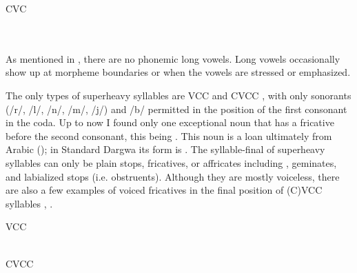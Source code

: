 \begin{exe}
\TabPositions{11em}
	\ex	CVC	\label{ex:syllable CVC phon} \\
		 	\tab 	{} 	\\
		 	\tab 	{} 	\\
		 	\tab 	{} 	
\end{exe}

As mentioned in , there are no phonemic long vowels. Long vowels occasionally show up at morpheme boundaries or when the vowels are stressed or emphasized.

The only types of superheavy syllables are VCC  and CVCC , with only sonorants (/r/, /l/, /n/, /m/, /j/) and /b/ permitted in the position of the first consonant in the coda. Up to now I found only one exceptional noun that has a fricative before the second consonant, this being  . This noun is a loan ultimately from Arabic (); in Standard Dargwa its form is . The syllable-final  of superheavy syllables can only be plain stops, fricatives, or affricates including , geminates, and labialized stops (i.e. obstruents). Although they are mostly voiceless, there are also a few examples of voiced fricatives in the final position of (C)VCC syllables , .
%
\begin{exe}
\TabPositions{13em}
	\ex	VCC	\label{ex:syllable VCC phon}\\
		 	\tab 		{} 	\\
		 	\tab 		{} 	
\end{exe}

\begin{exe}
\TabPositions{13em}
	\ex	CVCC	\label{ex:syllable CVCC phon}\\
		 	\tab 		{} 	\\
		  	\tab 		{} 	\\
		 	\tab 		{} 	\\
		 	\tab 		{} 	\\
		 	\tab 		{}  	\\
		 	\tab 		{} 	\\
		 	
\end{exe}
 
